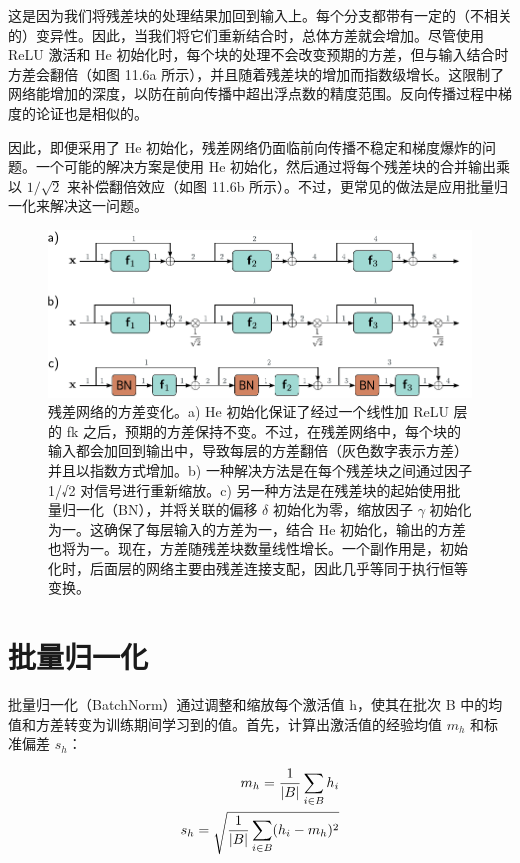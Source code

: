 \documentclass[lang=cn,newtx,10pt,scheme=chinese]{elegantbook}
\begin{document}
这是因为我们将残差块的处理结果加回到输入上。每个分支都带有一定的（不相关的）变异性。因此，当我们将它们重新结合时，总体方差就会增加。尽管使用 ReLU 激活和 He 初始化时，每个块的处理不会改变预期的方差，但与输入结合时方差会翻倍（如图 11.6a 所示），并且随着残差块的增加而指数级增长。这限制了网络能增加的深度，以防在前向传播中超出浮点数的精度范围。反向传播过程中梯度的论证也是相似的。

因此，即便采用了 He 初始化，残差网络仍面临前向传播不稳定和梯度爆炸的问题。一个可能的解决方案是使用 He 初始化，然后通过将每个残差块的合并输出乘以 \(1/\sqrt{2}\) 来补偿翻倍效应（如图 11.6b 所示）。不过，更常见的做法是应用批量归一化来解决这一问题。

\begin{figure}[ht!]
\centering
\includegraphics[width=0.7\linewidth]{PDFFigures/UDLChap11PDF/ResidualVariance.pdf}
\caption{残差网络的方差变化。a) He 初始化保证了经过一个线性加 ReLU 层的 fk 之后，预期的方差保持不变。不过，在残差网络中，每个块的输入都会加回到输出中，导致每层的方差翻倍（灰色数字表示方差）并且以指数方式增加。b) 一种解决方法是在每个残差块之间通过因子 1/√2 对信号进行重新缩放。c) 另一种方法是在残差块的起始使用批量归一化（BN），并将关联的偏移 \(\delta\) 初始化为零，缩放因子 \(\gamma\) 初始化为一。这确保了每层输入的方差为一，结合 He 初始化，输出的方差也将为一。现在，方差随残差块数量线性增长。一个副作用是，初始化时，后面层的网络主要由残差连接支配，因此几乎等同于执行恒等变换。}
\end{figure}


\section{批量归一化}
批量归一化（BatchNorm）通过调整和缩放每个激活值 h，使其在批次 B 中的均值和方差转变为训练期间学习到的值。首先，计算出激活值的经验均值 \(m_h\) 和标准偏差 \(s_h\)：

\begin{align}
m_h = \frac{1}{|B|} \sum_{i \in B} h_i \notag \\
s_h = \sqrt{\frac{1}{|B|} \sum_{i \in B} (h_i - m_h)^2}  
\end{align}
\end{document}

